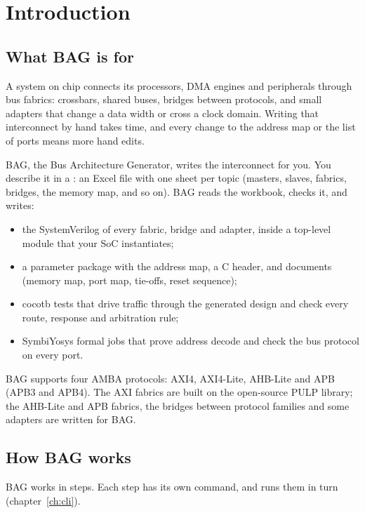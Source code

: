 \chapter{Introduction}
\label{ch:intro}

\section{What BAG is for}

A system on chip connects its processors, DMA engines and peripherals through bus
fabrics: crossbars, shared buses, bridges between protocols, and small adapters that
change a data width or cross a clock domain. Writing that interconnect by hand takes
time, and every change to the address map or the list of ports means more hand edits.

BAG, the Bus Architecture Generator, writes the interconnect for you. You describe it in
a : an Excel file with one sheet per topic (masters, slaves, fabrics,
bridges, the memory map, and so on). BAG reads the workbook, checks it, and writes:

\begin{itemize}
\item the SystemVerilog of every fabric, bridge and adapter, inside a top-level
   module that your SoC instantiates;
\item a parameter package with the address map, a C header, and documents (memory map,
  port map, tie-offs, reset sequence);
\item cocotb tests that drive traffic through the generated design and check every
  route, response and arbitration rule;
\item SymbiYosys formal jobs that prove address decode and check the bus protocol on
  every port.
\end{itemize}

BAG supports four AMBA protocols: AXI4, AXI4-Lite, AHB-Lite and APB (APB3 and APB4).
The AXI fabrics are built on the open-source PULP  library; the AHB-Lite and
APB fabrics, the bridges between protocol families and some adapters are written for
BAG.

\section{How BAG works}

BAG works in steps. Each step has its own command, and  runs them in turn
(chapter~\ref{ch:cli}).

